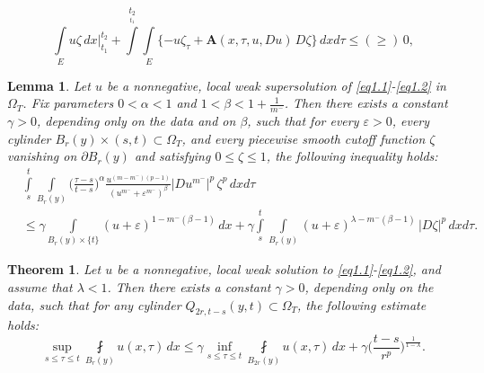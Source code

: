 \documentclass[10pt,a4paper]{amsart}
\newtheorem{lemma}{Lemma}
\newtheorem{theorem}{Theorem}
\begin{document}
\begin{equation}\label{eq1.3}
\int\limits_{E}u \zeta\, dx \bigg|^{t_{2}}_{t_{1}} + \int\limits^{t_{2}}\limits_{t_{1}}\int\limits_{E}
\{-u\zeta_{\tau}+ \mathbf{A}(x, \tau, u, D u) \,D \zeta\}\, dx d\tau \leqslant (\geqslant)\, 0,
\end{equation}

\begin{lemma}\label{lem2.3}
Let $u$ be a nonnegative, local weak supersolution of \eqref{eq1.1}-\eqref{eq1.2} in $\Omega_T$. Fix parameters $0<\alpha<1$ and $1<\beta<1+\frac{1}{m^{-}}$. Then there exists a constant $\gamma>0$, depending only on the data and on $\beta$, such that for every $\varepsilon>0$, every cylinder $B_r(y)\times(s,t)\subset\Omega_T$, and every piecewise smooth cutoff function $\zeta$ vanishing on $\partial B_r(y)$ and satisfying $0\leqslant\zeta\leqslant 1$, the following inequality holds:
\begin{equation}\label{eq2.2}
\begin{aligned}
&\int\limits_s^t\int\limits_{B_r(y)}\Big(\frac{\tau-s}{t-s}\Big)^\alpha
\frac{u^{(m-m^-)(p-1)}}{(u^{m^-}+\varepsilon^{m^-})^\beta}|D u^{m^-}|^{p}\,\zeta^{p}\,dx d\tau
\\&\leqslant \gamma \int\limits_{B_r(y)\times\{t\}}(u+\varepsilon)^{1-m^-(\beta-1)}\,dx+
\gamma \int\limits_s^t\int\limits_{B_r(y)}(u+\varepsilon)^{\lambda-m^-(\beta-1)}\,|D \zeta|^{p}\,dx d\tau.
\end{aligned}
\end{equation}
\end{lemma}

\begin{theorem}\label{lem3.1}
Let $u$ be a nonnegative, local weak solution to \eqref{eq1.1}-\eqref{eq1.2}, and assume that $\lambda<1$. Then there exists a constant $\gamma>0$, depending only on the data, such that for any cylinder $Q_{2r,t-s}(y,t)\subset\Omega_T$, the following estimate holds:
\begin{equation}\label{eq3.1}
\sup\limits_{s\leqslant \tau\leqslant t}\fint\limits_{B_{r}(y)}u(x, \tau)\, dx \leqslant \gamma
\inf\limits_{s\leqslant \tau \leqslant t}\fint\limits_{B_{2 r}(y)} u(x, \tau)\,dx +\gamma
\Big(\frac{t-s}{r^{p}}\Big)^{\frac{1}{1-\lambda}}.
\end{equation}
\end{theorem}
\end{document}
